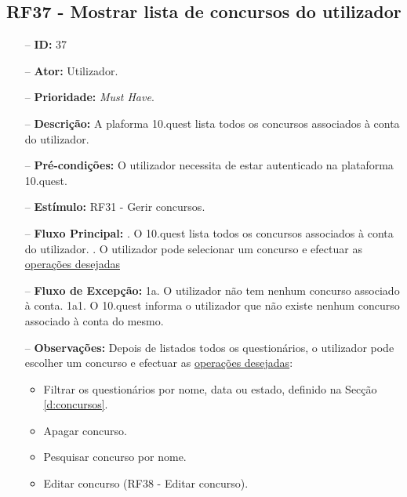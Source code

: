 \subsection{RF37 - Mostrar lista de concursos do utilizador}
\begin{itemize}
	\item[--] \textbf{ID:} 37
	\item[--]  \textbf{Ator:} Utilizador.
	\item[--]  \textbf{Prioridade:} \textit{Must Have}.
	\item[--]  \textbf{Descrição:} A plaforma 10.quest lista todos os concursos associados à conta do utilizador.
	\item[--]  \textbf{Pré-condições:} O utilizador necessita de estar autenticado na plataforma 10.quest.
	\item[--]  \textbf{Estímulo:} RF31 - Gerir concursos.
	\item[--]  \textbf{Fluxo Principal:} 
	. O 10.quest lista todos os concursos associados à conta do utilizador.
	. O utilizador pode selecionar um concurso e efectuar as \underline{operações desejadas}
	\item[--]  \textbf{Fluxo de Excepção:} 
	\subitem 1a. O utilizador não tem nenhum concurso associado à conta.
	\subitem 1a1. O 10.quest informa o utilizador que não existe nenhum concurso  associado à conta do mesmo.
	\item[--]  \textbf{Observações:} Depois de listados todos os questionários, o utilizador pode escolher um concurso e efectuar as \underline{operações desejadas}:
	\begin{itemize}
		\item Filtrar os questionários por nome, data ou estado, definido na Secção \ref{d:concursos}.
		\item Apagar concurso.
		\item Pesquisar concurso por nome.
		\item Editar concurso (RF38 - Editar concurso).
	\end{itemize}
\end{itemize}
\newpage

